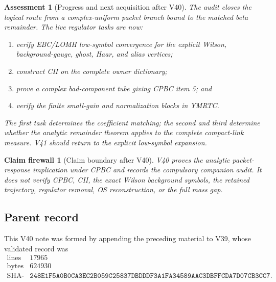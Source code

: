 \documentclass[11pt,oneside]{book}
\newtheorem{assessment}[theorem]{Assessment}
\newtheorem{firewall}[theorem]{Claim firewall}
\theoremstyle{definition}
\theoremstyle{remark}
\begin{document}
\begin{assessment}[Progress and next acquisition after V40]
\label{ass:e8v40-status}
The audit closes the logical route from a complex-uniform packet
branch bound to the matched beta remainder.  The live regulator
tasks are now:
\begin{enumerate}
\item verify EBC/LOMH low-symbol convergence for the explicit
      Wilson, background-gauge, ghost, Haar, and alias vertices;
\item construct CII on the complete owner dictionary;
\item prove a complex bad-component tube giving CPBC item 5; and
\item verify the finite small-gain and normalization blocks in
      YMRTC.
\end{enumerate}
The first task determines the coefficient matching; the second and
third determine whether the analytic remainder theorem applies to
the complete compact-link measure.  V41 should return to the explicit
low-symbol expansion.
\end{assessment}

\begin{firewall}[Claim boundary after V40]
\label{fire:e8v40-claim}
V40 proves the analytic packet-response implication under CPBC and
records the compulsory companion audit.  It does not verify CPBC,
CII, the exact Wilson background symbols, the retained trajectory,
regulator removal, OS reconstruction, or the full mass gap.
\end{firewall}

\subsection{Parent record}

This V40 note was formed by appending the preceding material to V39,
whose validated record was
\[
\begin{array}{c|c}
\text{lines}&17965\\
\text{bytes}&624930\\
\text{SHA-256}&
\texttt{248E1F5A0B0CA3EC2B059C25837DBDDDF3A1FA34589AAC3DBFFCDA7D07CB3CC7}.
\end{array}
\]


\end{document}

